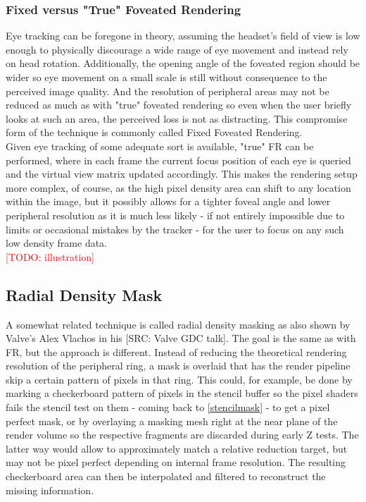 \subsubsection{Fixed versus "True" Foveated Rendering}
Eye tracking can be foregone in theory, assuming the headset's field of view is low enough to physically discourage a wide range of eye movement and instead rely on head rotation. Additionally, the opening angle of the foveated region should be wider so eye movement on a small scale is still without consequence to the perceived image quality. And the resolution of peripheral areas may not be reduced as much as with "true" foveated rendering so even when the user briefly looks at such an area, the perceived loss is not as distracting. This compromise form of the technique is commonly called Fixed Foveated Rendering. \\
Given eye tracking of some adequate sort is available, "true" FR can be performed, where in each frame the current focus position of each eye is queried and the virtual view matrix updated accordingly. This makes the rendering setup more complex, of course, as the high pixel density area can shift to any location within the image, but it possibly allows for a tighter foveal angle and lower peripheral resolution as it is much less likely - if not entirely impossible due to limits or occasional mistakes by the tracker - for the user to focus on any such low density frame data. \\

\textcolor{red}{[TODO: illustration]}

\subsection{Radial Density Mask}
A somewhat related technique is called radial density masking as also shown by Valve's Alex Vlachos in his [SRC: Valve GDC talk]. The goal is the same as with FR, but the approach is different. Instead of reducing the theoretical rendering resolution of the peripheral ring, a mask is overlaid that has the render pipeline skip a certain pattern of pixels in that ring. This could, for example, be done by marking a checkerboard pattern of pixels in the stencil buffer so the pixel shaders fails the stencil test on them - coming back to \autoref{stencilmask} - to get a pixel perfect mask, or by overlaying a masking mesh right at the near plane of the render volume so the respective fragments are discarded during early Z tests. The latter way would allow to approximately match a relative reduction target, but may not be pixel perfect depending on internal frame resolution. 
The resulting checkerboard area can then be interpolated and filtered to reconstruct the missing information. \\

